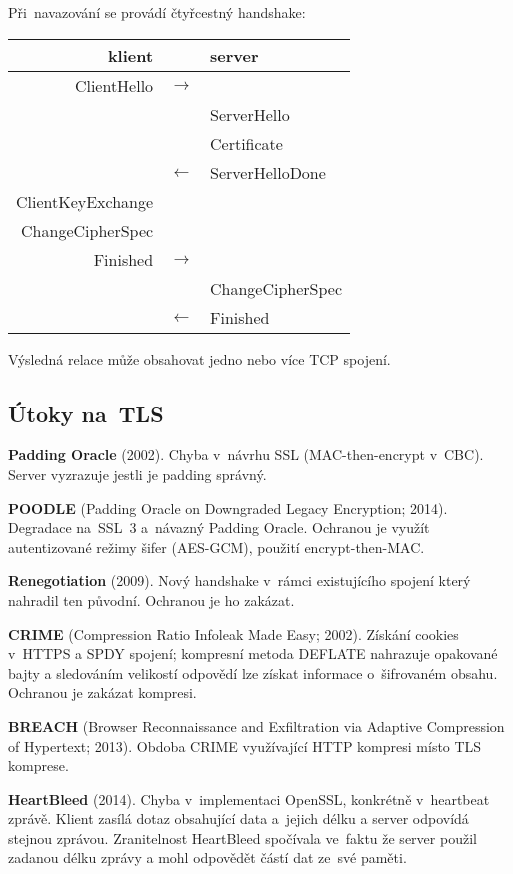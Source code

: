 Při~navazování se provádí čtyřcestný handshake:
\begin{center}
\begin{tabular}{rcl}
	klient & & server \\
	\hline
	ClientHello & $\rightarrow$ & \\
	& & ServerHello \\
	& & Certificate \\
	& $\leftarrow$ & ServerHelloDone \\
	ClientKeyExchange & & \\
	ChangeCipherSpec & & \\
	Finished & $\rightarrow$ & \\
	& & ChangeCipherSpec \\
	& $\leftarrow$ & Finished \\
\end{tabular}
\end{center}
Výsledná relace může obsahovat jedno nebo více TCP spojení.


\subsection{Útoky na~TLS}

\textbf{Padding Oracle} (2002).
Chyba v~návrhu SSL (MAC-then-encrypt v~CBC).
Server vyzrazuje jestli je padding správný.

\textbf{POODLE} (Padding Oracle on Downgraded Legacy Encryption; 2014).
Degradace na~SSL~3 a~návazný Padding Oracle.
Ochranou je využít autentizované režimy šifer (AES-GCM), použití encrypt-then-MAC.

\textbf{Renegotiation} (2009).
Nový handshake v~rámci existujícího spojení který nahradil ten původní.
Ochranou je ho zakázat.

\textbf{CRIME} (Compression Ratio Infoleak Made Easy; 2002).
Získání cookies v~HTTPS a SPDY spojení; kompresní metoda DEFLATE nahrazuje opakované bajty a sledováním velikostí odpovědí lze získat informace o~šifrovaném obsahu.
Ochranou je zakázat kompresi.

\textbf{BREACH} (Browser Reconnaissance and Exfiltration via Adaptive Compression of Hypertext; 2013).
Obdoba CRIME využívající HTTP kompresi místo TLS komprese.

\textbf{HeartBleed} (2014).
Chyba v~implementaci OpenSSL, konkrétně v~heartbeat zprávě.
Klient zasílá dotaz obsahující data a~jejich délku a server odpovídá stejnou zprávou.
Zranitelnost HeartBleed spočívala ve~faktu že server použil zadanou délku zprávy a mohl odpovědět částí dat ze~své paměti.


